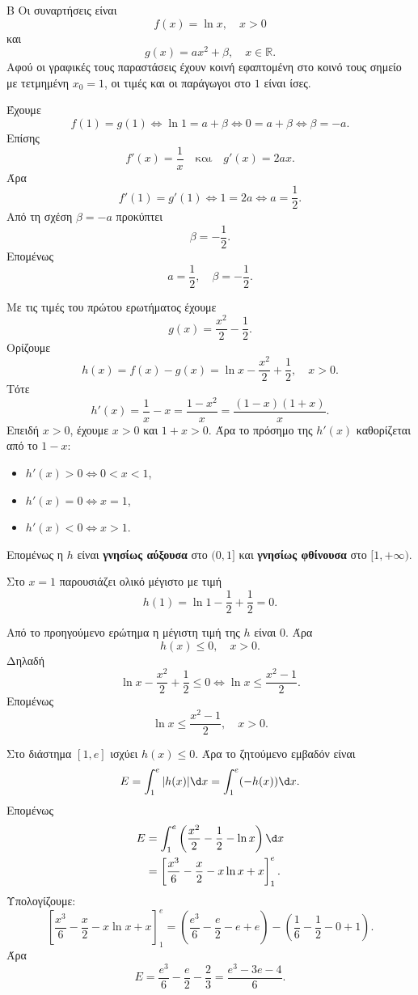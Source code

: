 \begin{thema}{Β}
Οι συναρτήσεις είναι
\[
f(x)=\ln x,\quad x>0
\]
και
\[
g(x)=a x^2+\beta,\quad x\in\mathbb{R}.
\]
Αφού οι γραφικές τους παραστάσεις έχουν κοινή εφαπτομένη στο κοινό τους σημείο με τετμημένη $x_0=1$, οι τιμές και οι παράγωγοι στο $1$ είναι ίσες.

\begin{erwthma}
\item Έχουμε
\[
f(1)=g(1)\Leftrightarrow \ln 1=a+\beta
\Leftrightarrow 0=a+\beta
\Leftrightarrow \beta=-a.
\]
Επίσης
\[
f'(x)=\frac{1}{x}
\quad\text{και}\quad
g'(x)=2ax.
\]
Άρα
\[
f'(1)=g'(1)\Leftrightarrow 1=2a
\Leftrightarrow a=\frac{1}{2}.
\]
Από τη σχέση $\beta=-a$ προκύπτει
\[
\beta=-\frac{1}{2}.
\]
Επομένως
\[
a=\frac{1}{2},\quad \beta=-\frac{1}{2}.
\]

\item Με τις τιμές του πρώτου ερωτήματος έχουμε
\[
g(x)=\frac{x^2}{2}-\frac{1}{2}.
\]
Ορίζουμε
\[
h(x)=f(x)-g(x)=\ln x-\frac{x^2}{2}+\frac{1}{2},\quad x>0.
\]
Τότε
\[
h'(x)=\frac{1}{x}-x=\frac{1-x^2}{x}
=\frac{(1-x)(1+x)}{x}.
\]
Επειδή $x>0$, έχουμε $x>0$ και $1+x>0$. Άρα το πρόσημο της $h'(x)$ καθορίζεται από το $1-x$:
\begin{itemize}
\item $h'(x)>0\Leftrightarrow 0<x<1$,
\item $h'(x)=0\Leftrightarrow x=1$,
\item $h'(x)<0\Leftrightarrow x>1$.
\end{itemize}
Επομένως η $h$ είναι \textbf{γνησίως αύξουσα} στο $(0,1]$ και \textbf{γνησίως φθίνουσα} στο $[1,+\infty)$.

Στο $x=1$ παρουσιάζει ολικό μέγιστο με τιμή
\[
h(1)=\ln 1-\frac{1}{2}+\frac{1}{2}=0.
\]

\item Από το προηγούμενο ερώτημα η μέγιστη τιμή της $h$ είναι $0$. Άρα
\[
h(x)\leq 0,\quad x>0.
\]
Δηλαδή
\[
\ln x-\frac{x^2}{2}+\frac{1}{2}\leq 0
\Leftrightarrow
\ln x\leq \frac{x^2-1}{2}.
\]
Επομένως
\[
\ln x\leq \frac{x^2-1}{2},\quad x>0.
\]

\item Στο διάστημα $[1,e]$ ισχύει $h(x)\leq 0$. Άρα το ζητούμενο εμβαδόν είναι
\[
E=\dint_1^e |h(x)|\d x=\dint_1^e (-h(x))\d x.
\]
Επομένως
\begin{align*}
E
&=\dint_1^e\left(\frac{x^2}{2}-\frac{1}{2}-\ln x\right)\d x\\
&=\left[\frac{x^3}{6}-\frac{x}{2}-x\ln x+x\right]_1^e.
\end{align*}
Υπολογίζουμε:
\[
\left[\frac{x^3}{6}-\frac{x}{2}-x\ln x+x\right]_1^e
=\left(\frac{e^3}{6}-\frac{e}{2}-e+e\right)
-\left(\frac{1}{6}-\frac{1}{2}-0+1\right).
\]
Άρα
\[
E=\frac{e^3}{6}-\frac{e}{2}-\frac{2}{3}
=\frac{e^3-3e-4}{6}.
\]
\end{erwthma}
\end{thema}

